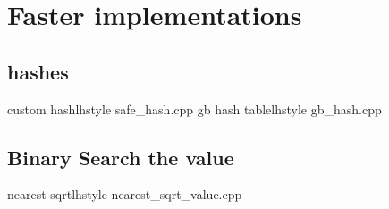 \section{Faster implementations}
  \subsection{hashes}
     {custom hash}{lhstyle} {safe_hash.cpp}
     {gb hash table}{lhstyle} {gb_hash.cpp}
  \subsection{Binary Search the value}
     {nearest sqrt}{lhstyle} {nearest_sqrt_value.cpp}
        
